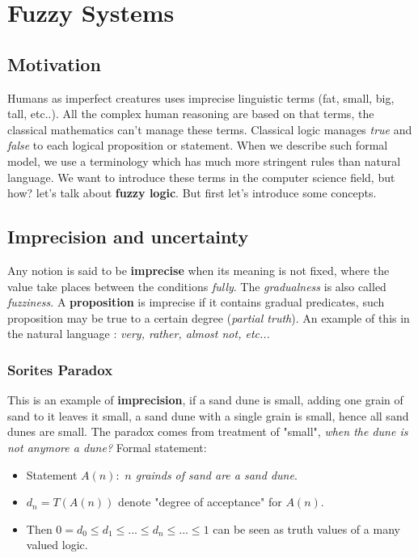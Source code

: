 \documentclass{article}
\begin{document}
\section{Fuzzy Systems}
\subsection{Motivation}
Humans as imperfect creatures uses imprecise linguistic terms (fat, small, big, tall, etc..).
All the complex human reasoning are based on that terms, the classical mathematics can't manage
these terms.
Classical logic manages \textit{true} and \textit{false} to each logical proposition or statement.
When we describe such formal model, we use a terminology which has much more stringent rules than natural
language.
\newline\newline
We want to introduce these terms in the computer science field, but how? let's
talk about \textbf{fuzzy logic}. But first let's introduce some concepts.
\subsection{Imprecision and uncertainty}
Any notion is said to be \textbf{imprecise} when its meaning is not fixed, where the value
take places between the conditions \textit{fully}. The \textit{gradualness} is also called
\textit{fuzziness}.
\newline\newline
A \textbf{proposition} is imprecise if it contains gradual predicates, such proposition
may be true to a certain degree (\textit{partial truth}). An example of this in the
natural language : \textit{very, rather, almost not, etc...}

\subsubsection{Sorites Paradox}
This is an example of \textbf{imprecision}, if a sand dune is small, adding one grain of
sand to it leaves it small, a sand dune with a single grain is small, hence all
sand dunes are small.
\newline\newline
The paradox comes from treatment of "small", \textit{when the dune is not anymore a dune?}
Formal statement:
\begin{itemize}
    \item Statement $A(n):$ \textit{$n$ grainds of sand are a sand dune}.
    \item $d_n=T(A(n))$ denote "degree of acceptance" for $A(n)$.
    \item Then $0=d_0\leq d_1 \leq ... \leq d_n \leq ... \leq 1$ can
          be seen as truth values of a many valued logic.
\end{itemize}
\end{document}

